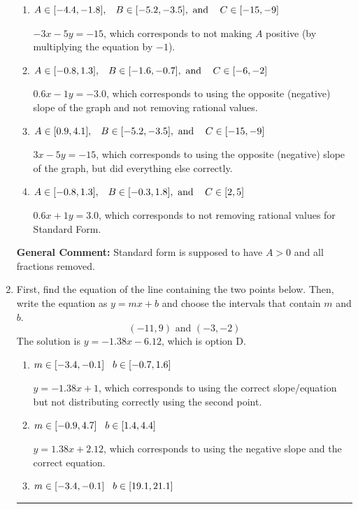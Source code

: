 \documentclass{extbook}[14pt]
\newcommand{\litem}[1]{\item #1

\rule{\textwidth}{0.4pt}}
\begin{document}
\begin{enumerate}
{\begin{enumerate}[label=\Alph*.]
* $3x + 5y = 15$, which is the correct option.
\item \( A \in [-4.4, -1.8], \hspace{3mm} B \in [-5.2, -3.5], \text{ and } \hspace{3mm} C \in [-15, -9] \)

 $-3x - 5y = -15$, which corresponds to not making $A$ positive (by multiplying the equation by $-1$).
\item \( A \in [-0.8, 1.3], \hspace{3mm} B \in [-1.6, -0.7], \text{ and } \hspace{3mm} C \in [-6, -2] \)

 $0.6x - 1y = -3.0$, which corresponds to using the opposite (negative) slope of the graph and not removing rational values.
\item \( A \in [0.9, 4.1], \hspace{3mm} B \in [-5.2, -3.5], \text{ and } \hspace{3mm} C \in [-15, -9] \)

 $3x - 5y = -15$, which corresponds to using the opposite (negative) slope of the graph, but did everything else correctly.
\item \( A \in [-0.8, 1.3], \hspace{3mm} B \in [-0.3, 1.8], \text{ and } \hspace{3mm} C \in [2, 5] \)

 $0.6x + 1y = 3.0$, which corresponds to not removing rational values for Standard Form.
\end{enumerate}

\textbf{General Comment:} Standard form is supposed to have $A > 0$ and all fractions removed.
}
\litem{
First, find the equation of the line containing the two points below. Then, write the equation as $ y=mx+b $ and choose the intervals that contain $m$ and $b$.
\[ (-11, 9) \text{ and } (-3, -2) \]
The solution is \( y = -1.38x -6.12 \), which is option D.\begin{enumerate}[label=\Alph*.]
\item \( m \in [-3.4, -0.1] \hspace*{3mm} b \in [-0.7, 1.6] \)

 $y = -1.38x + 1$, which corresponds to using the correct slope/equation but not distributing correctly using the second point.
\item \( m \in [-0.9, 4.7] \hspace*{3mm} b \in [1.4, 4.4] \)

 $y = 1.38x + 2.12$, which corresponds to using the negative slope and the correct equation.
\item \( m \in [-3.4, -0.1] \hspace*{3mm} b \in [19.1, 21.1] \)


\end{enumerate}}
\end{enumerate}
\end{document}
